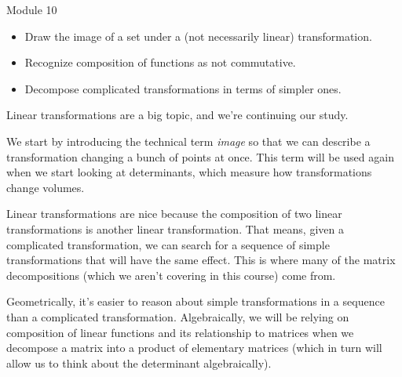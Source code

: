 \begin{lesson}

	Module 10

	\begin{itemize}
		\item Draw the image of a set under a (not necessarily linear) transformation.
		\item Recognize composition of functions as not commutative.
		\item Decompose complicated transformations in terms of simpler ones.
	\end{itemize}

		Linear transformations are a big topic, and we're continuing our study.

		We start by introducing the technical term \emph{image} so that we can describe
		a transformation changing a bunch of points at once. This term will be used again when
		we start looking at determinants, which measure how transformations change volumes.

		Linear transformations are nice because the composition of two linear transformations
		is another linear transformation. That means, given a complicated transformation, we can
		search for a sequence of simple transformations that will have the same effect. This is
		where many of the matrix decompositions (which we aren't covering in this course) come from.

		Geometrically, it's easier to reason about simple transformations in a sequence than a complicated
		transformation. Algebraically, we will be relying on composition of linear functions and its relationship
		to matrices when we decompose a matrix into a product of elementary matrices (which in turn will
		allow us to think about the determinant algebraically).
\end{lesson}
	\bookonlynewpage

